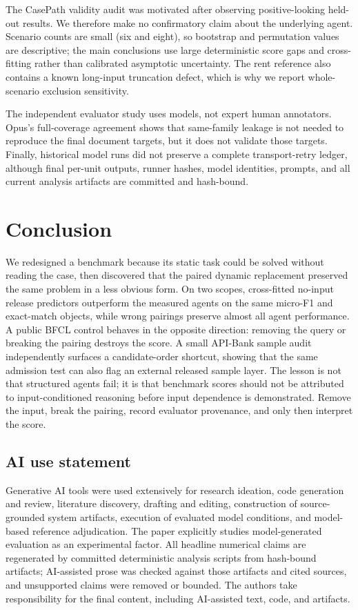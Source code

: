 \documentclass{article}
\begin{document}
The CasePath validity audit was motivated after observing positive-looking held-out results. We therefore make no confirmatory claim about the underlying agent. Scenario counts are small (six and eight), so bootstrap and permutation values are descriptive; the main conclusions use large deterministic score gaps and cross-fitting rather than calibrated asymptotic uncertainty. The rent reference also contains a known long-input truncation defect, which is why we report whole-scenario exclusion sensitivity.

The independent evaluator study uses models, not expert human annotators. Opus's full-coverage agreement shows that same-family leakage is not needed to reproduce the final document targets, but it does not validate those targets. Finally, historical model runs did not preserve a complete transport-retry ledger, although final per-unit outputs, runner hashes, model identities, prompts, and all current analysis artifacts are committed and hash-bound.

\section{Conclusion}
We redesigned a benchmark because its static task could be solved without reading the case, then discovered that the paired dynamic replacement preserved the same problem in a less obvious form. On two scopes, cross-fitted no-input release predictors outperform the measured agents on the same micro-F1 and exact-match objects, while wrong pairings preserve almost all agent performance. A public BFCL control behaves in the opposite direction: removing the query or breaking the pairing destroys the score. A small API-Bank sample audit independently surfaces a candidate-order shortcut, showing that the same admission test can also flag an external released sample layer. The lesson is not that structured agents fail; it is that benchmark scores should not be attributed to input-conditioned reasoning before input dependence is demonstrated. Remove the input, break the pairing, record evaluator provenance, and only then interpret the score.

\subsection*{AI use statement}
Generative AI tools were used extensively for research ideation, code generation and review, literature discovery, drafting and editing, construction of source-grounded system artifacts, execution of evaluated model conditions, and model-based reference adjudication. The paper explicitly studies model-generated evaluation as an experimental factor. All headline numerical claims are regenerated by committed deterministic analysis scripts from hash-bound artifacts; AI-assisted prose was checked against those artifacts and cited sources, and unsupported claims were removed or bounded. The authors take responsibility for the final content, including AI-assisted text, code, and artifacts.
\end{document}
